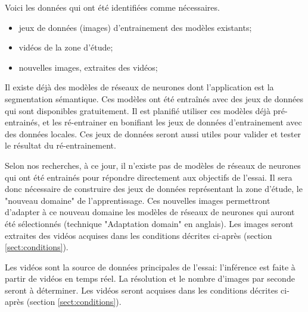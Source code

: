 Voici les données qui ont été identifiées comme nécessaires.
\begin{itemize}
   \item jeux de données (images) d'entrainement des modèles existants;
   \item vidéos de la zone d'étude; 
   \item nouvelles images, extraites des vidéos;
\end{itemize}
\vspace{1\baselineskip}
\par Il existe déjà des modèles de réseaux de neurones dont l'application est la segmentation sémantique. Ces modèles ont été entraînés avec des jeux de données qui sont disponibles gratuitement. Il est planifié utiliser ces modèles déjà pré-entrainés, et les ré-entrainer en bonifiant les jeux de données d'entrainement avec des données locales. Ces jeux de données seront aussi utiles pour valider et tester le résultat du ré-entrainement.
\par Selon nos recherches, à ce jour, il n'existe pas de modèles de réseaux de neurones qui ont été entrainés pour répondre directement aux objectifs de l'essai. Il sera donc nécessaire de construire des jeux de données représentant la zone d'étude, le "nouveau domaine" de l'apprentissage. Ces nouvelles images permettront d'adapter à ce nouveau domaine les modèles de réseaux de neurones qui auront été sélectionnés (technique "Adaptation domain" en anglais). Les images seront extraites des vidéos acquises dans les conditions décrites ci-après (section \ref{sect:conditions}).
\par Les vidéos sont la source de données principales de l'essai: l'inférence est faite à partir de vidéos en temps réel. La résolution et le nombre d'images par seconde seront à déterminer. Les vidéos seront acquises dans les conditions décrites ci-après (section \ref{sect:conditions}).
